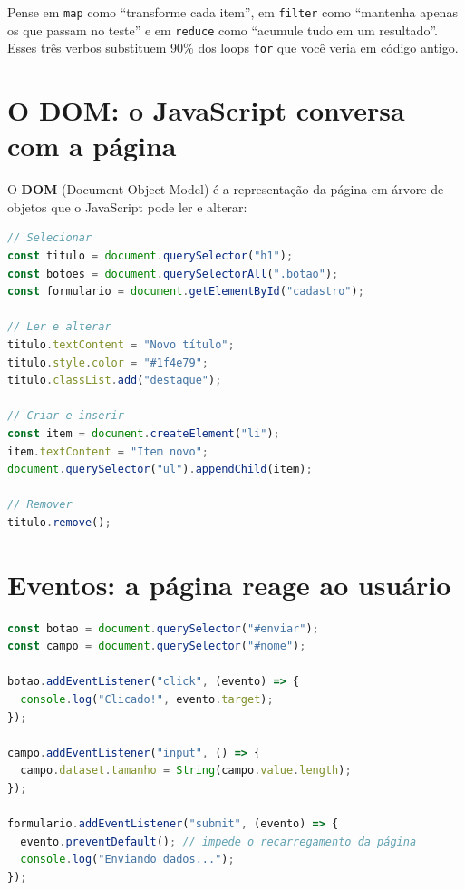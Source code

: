 \begin{caixadica}
Pense em \texttt{map} como ``transforme cada item'', em \texttt{filter} como
``mantenha apenas os que passam no teste'' e em \texttt{reduce} como ``acumule
tudo em um resultado''. Esses três verbos substituem 90\% dos loops
\texttt{for} que você veria em código antigo.
\end{caixadica}

\section{O DOM: o JavaScript conversa com a página}

O \textbf{DOM} (Document Object Model) é a representação da página em árvore de
objetos que o JavaScript pode ler e alterar:

\begin{lstlisting}[style=livro, language=JavaScript,
  caption={Manipulação básica do DOM.}, label={list:js-dom}]
// Selecionar
const titulo = document.querySelector("h1");
const botoes = document.querySelectorAll(".botao");
const formulario = document.getElementById("cadastro");

// Ler e alterar
titulo.textContent = "Novo título";
titulo.style.color = "#1f4e79";
titulo.classList.add("destaque");

// Criar e inserir
const item = document.createElement("li");
item.textContent = "Item novo";
document.querySelector("ul").appendChild(item);

// Remover
titulo.remove();
\end{lstlisting}

\section{Eventos: a página reage ao usuário}

\begin{lstlisting}[style=livro, language=JavaScript,
  caption={Eventos: clique, input e envio de formulário.}, label={list:js-eventos}]
const botao = document.querySelector("#enviar");
const campo = document.querySelector("#nome");

botao.addEventListener("click", (evento) => {
  console.log("Clicado!", evento.target);
});

campo.addEventListener("input", () => {
  campo.dataset.tamanho = String(campo.value.length);
});

formulario.addEventListener("submit", (evento) => {
  evento.preventDefault(); // impede o recarregamento da página
  console.log("Enviando dados...");
});
\end{lstlisting}

